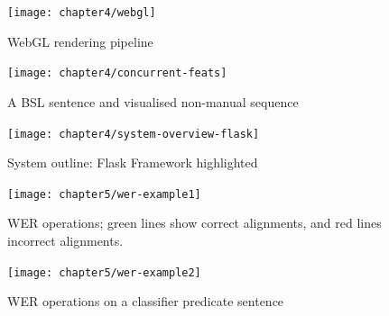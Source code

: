 \documentclass[12pt]{ociamthesis}  %
\begin{document}
\begin{figure}[H]
	\centering
    \texttt{[image: chapter4/webgl]}
    \caption{WebGL rendering pipeline}
    \label{fig:webgl}
\end{figure}	

\begin{figure}[H]
	\centering
    \texttt{[image: chapter4/concurrent-feats]}
    \caption{A BSL sentence and visualised non-manual sequence}
    \label{fig:concurrent-feats}
\end{figure}	

\begin{figure}[H]
	\centering
    \texttt{[image: chapter4/system-overview-flask]}
    \caption{System outline: Flask Framework highlighted}
    \label{fig:sys-over-flask}
\end{figure}	

\begin{figure}[H]
	\centering
    \texttt{[image: chapter5/wer-example1]}
    \caption[WER operations]{WER operations; green lines show correct alignments, and red lines incorrect alignments.}
    \label{fig:wer1}
\end{figure}	

\begin{figure}[H]
	\centering
    \texttt{[image: chapter5/wer-example2]}
    \caption{WER operations on a classifier predicate sentence}
    \label{fig:wer2}
\end{figure}	

\end{document}
